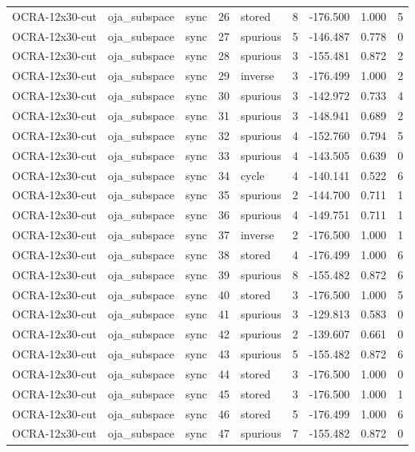 \begin{tabular}{lllrlrrrr}
OCRA-12x30-cut & oja\_subspace & sync & 26 & stored & 8 & -176.500 & 1.000 & 5 \\
OCRA-12x30-cut & oja\_subspace & sync & 27 & spurious & 5 & -146.487 & 0.778 & 0 \\
OCRA-12x30-cut & oja\_subspace & sync & 28 & spurious & 3 & -155.481 & 0.872 & 2 \\
OCRA-12x30-cut & oja\_subspace & sync & 29 & inverse & 3 & -176.499 & 1.000 & 2 \\
OCRA-12x30-cut & oja\_subspace & sync & 30 & spurious & 3 & -142.972 & 0.733 & 4 \\
OCRA-12x30-cut & oja\_subspace & sync & 31 & spurious & 3 & -148.941 & 0.689 & 2 \\
OCRA-12x30-cut & oja\_subspace & sync & 32 & spurious & 4 & -152.760 & 0.794 & 5 \\
OCRA-12x30-cut & oja\_subspace & sync & 33 & spurious & 4 & -143.505 & 0.639 & 0 \\
OCRA-12x30-cut & oja\_subspace & sync & 34 & cycle & 4 & -140.141 & 0.522 & 6 \\
OCRA-12x30-cut & oja\_subspace & sync & 35 & spurious & 2 & -144.700 & 0.711 & 1 \\
OCRA-12x30-cut & oja\_subspace & sync & 36 & spurious & 4 & -149.751 & 0.711 & 1 \\
OCRA-12x30-cut & oja\_subspace & sync & 37 & inverse & 2 & -176.500 & 1.000 & 1 \\
OCRA-12x30-cut & oja\_subspace & sync & 38 & stored & 4 & -176.499 & 1.000 & 6 \\
OCRA-12x30-cut & oja\_subspace & sync & 39 & spurious & 8 & -155.482 & 0.872 & 6 \\
OCRA-12x30-cut & oja\_subspace & sync & 40 & stored & 3 & -176.500 & 1.000 & 5 \\
OCRA-12x30-cut & oja\_subspace & sync & 41 & spurious & 3 & -129.813 & 0.583 & 0 \\
OCRA-12x30-cut & oja\_subspace & sync & 42 & spurious & 2 & -139.607 & 0.661 & 0 \\
OCRA-12x30-cut & oja\_subspace & sync & 43 & spurious & 5 & -155.482 & 0.872 & 6 \\
OCRA-12x30-cut & oja\_subspace & sync & 44 & stored & 3 & -176.500 & 1.000 & 0 \\
OCRA-12x30-cut & oja\_subspace & sync & 45 & stored & 3 & -176.500 & 1.000 & 1 \\
OCRA-12x30-cut & oja\_subspace & sync & 46 & stored & 5 & -176.499 & 1.000 & 6 \\
OCRA-12x30-cut & oja\_subspace & sync & 47 & spurious & 7 & -155.482 & 0.872 & 0 \\

\end{tabular}
